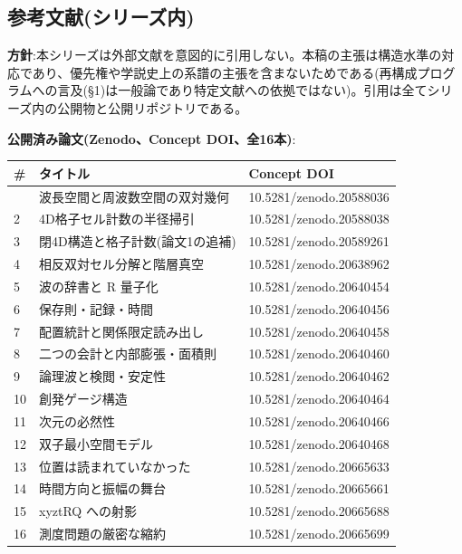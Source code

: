 \documentclass[
]{ltjsarticle}
\newcounter{none} %
\begin{document}
\subsection{参考文献(シリーズ内)}\label{ux53c2ux8003ux6587ux732eux30b7ux30eaux30fcux30baux5185}

\textbf{方針}:本シリーズは外部文献を意図的に引用しない。本稿の主張は構造水準の対応であり、優先権や学説史上の系譜の主張を含まないためである(再構成プログラムへの言及(§1)は一般論であり特定文献への依拠ではない)。引用は全てシリーズ内の公開物と公開リポジトリである。

\textbf{公開済み論文(Zenodo、Concept DOI、全16本)}:

{\def\LTcaptype{none} %
\begin{longtable}[]{@{}lll@{}}
\toprule\noalign{}
\# & タイトル & Concept DOI \\
\midrule\noalign{}
\endhead
\bottomrule\noalign{}
\endlastfoot
1 & 波長空間と周波数空間の双対幾何 & 10.5281/zenodo.20588036 \\
2 & 4D格子セル計数の半径掃引 & 10.5281/zenodo.20588038 \\
3 & 閉4D構造と格子計数(論文1の追補) & 10.5281/zenodo.20589261 \\
4 & 相反双対セル分解と階層真空 & 10.5281/zenodo.20638962 \\
5 & 波の辞書と R 量子化 & 10.5281/zenodo.20640454 \\
6 & 保存則・記録・時間 & 10.5281/zenodo.20640456 \\
7 & 配置統計と関係限定読み出し & 10.5281/zenodo.20640458 \\
8 & 二つの会計と内部膨張・面積則 & 10.5281/zenodo.20640460 \\
9 & 論理波と検閲・安定性 & 10.5281/zenodo.20640462 \\
10 & 創発ゲージ構造 & 10.5281/zenodo.20640464 \\
11 & 次元の必然性 & 10.5281/zenodo.20640466 \\
12 & 双子最小空間モデル & 10.5281/zenodo.20640468 \\
13 & 位置は読まれていなかった & 10.5281/zenodo.20665633 \\
14 & 時間方向と振幅の舞台 & 10.5281/zenodo.20665661 \\
15 & xyztRQ への射影 & 10.5281/zenodo.20665688 \\
16 & 測度問題の厳密な縮約 & 10.5281/zenodo.20665699 \\
\end{longtable}
}
\end{document}
